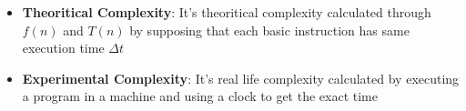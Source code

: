 \documentclass[fleqn]{article}
\begin{document}
\renewcommand{\arrayrulewidth}{0.75mm} %
\setlength{\tabcolsep}{12pt} %
\renewcommand{\arraystretch}{1.5} %

\begin{tcolorbox}[enhanced, colback=white!90!greenPlot, colframe=greenPlot!60!black, coltitle=white, fonttitle=\bfseries\Large, title=Some Terminology, boxrule=1mm, arc=0.5mm, drop shadow=greenPlot!35!gray]
\begin{itemize}
    \item \textbf{Theoritical Complexity}: It's theoritical complexity calculated through \(f(n)\) and \(T(n)\) by supposing that each basic instruction has same execution time \(\Delta t\)
    \item \textbf{Experimental Complexity}: It's real life complexity calculated by executing a program in a machine and using a clock to get the exact time
\end{itemize}
\end{tcolorbox}




\end{document}
